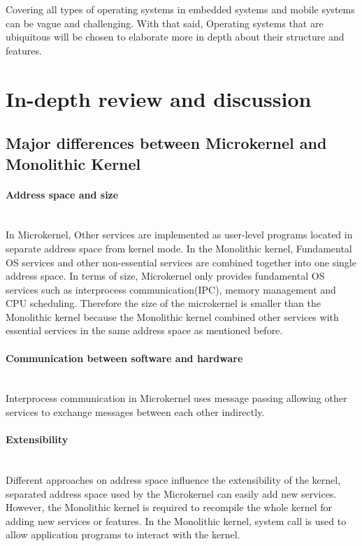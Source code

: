 \documentclass[conference]{IEEEtran}
\newcommand{\forceindent}{\leavevmode{\parindent=1em\indent}}
\begin{document}
\forceindent Covering all types of operating systems in embedded systems and mobile systems can be vague and challenging. With that said, Operating  systems  that are ubiquitous will be chosen to elaborate more in depth about their structure and features.



\medskip
\section{In-depth review and discussion}

\subsection{Major differences between Microkernel and Monolithic Kernel}
\paragraph{Address space and size}\mbox{} \\
\forceindent In Microkernel, Other services are implemented as user-level programs located in separate address space from kernel mode\cite{Galvinbook}. In the Monolithic kernel, Fundamental OS services and other non-essential services are combined together into one single address space\cite{Galvinbook}.  In terms of size, Microkernel only provides fundamental OS services such as interprocess communication(IPC), memory management and CPU scheduling\cite{Galvinbook}. Therefore the size of the microkernel is smaller than the Monolithic kernel because the Monolithic kernel combined other services with essential services in the same address space as mentioned before.

\bigskip
\paragraph{Communication between software and hardware}\mbox{} \\
\forceindent Interprocess communication in Microkernel uses message passing\cite{Burger} allowing other services to exchange messages between each other indirectly.

\bigskip
\paragraph{Extensibility}\mbox{} \\
\forceindent Different approaches on address space influence the extensibility of the kernel, separated address space used by the Microkernel can easily add new services. However, the Monolithic kernel is required to recompile the whole kernel for adding new services or features\cite{educba}. In the Monolithic kernel, system call is used to allow application programs to interact with the kernel.
\end{document}
